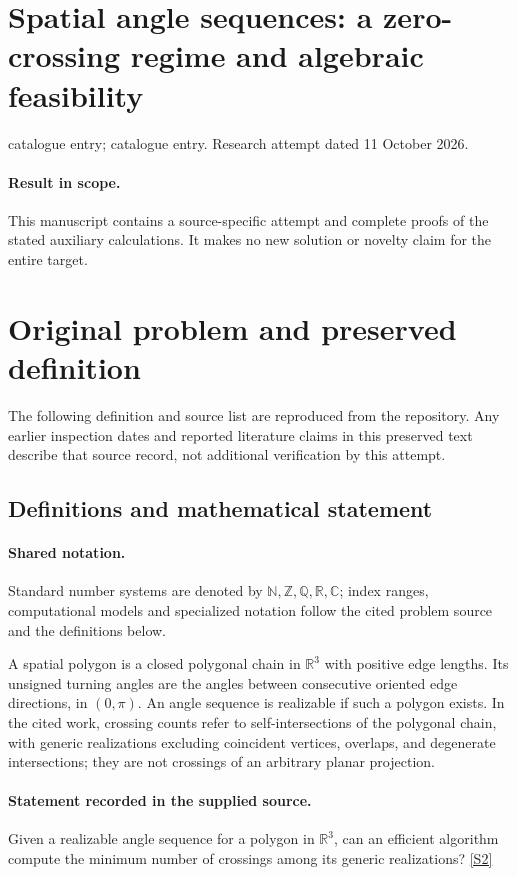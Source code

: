 \documentclass[11pt]{article}
\begin{document}
\section*{Spatial angle sequences: a zero-crossing regime and algebraic feasibility}
\noindent catalogue entry; catalogue entry. Research attempt dated 11 October 2026.
\paragraph{Result in scope.}This manuscript contains a source-specific attempt and complete proofs of the stated auxiliary calculations. It makes no new solution or novelty claim for the entire target.
\section{Original problem and preserved definition}
The following definition and source list are reproduced from the repository. Any earlier inspection dates and reported literature claims in this preserved text describe that source record, not additional verification by this attempt.
\subsection{Definitions and mathematical statement}

\paragraph{Shared notation.}Standard number systems are denoted by $\mathbb N,\mathbb Z,\mathbb Q,\mathbb R,\mathbb C$; index ranges, computational models and specialized notation follow the cited problem source and the definitions below.


A spatial polygon is a closed polygonal chain in $\mathbb R^3$ with positive edge lengths. Its unsigned turning angles are the angles between consecutive oriented edge directions, in $(0,\pi)$. An angle sequence is realizable if such a polygon exists. In the cited work, crossing counts refer to self-intersections of the polygonal chain, with generic realizations excluding coincident vertices, overlaps, and degenerate intersections; they are not crossings of an arbitrary planar projection.
\paragraph{Statement recorded in the supplied source.}
Given a realizable angle sequence for a polygon in $\mathbb{R}^3$, can an efficient algorithm compute the minimum number of crossings among its generic realizations? \href{https://doi.org/10.4171/owr/2020/30}{[S2]}
\end{document}
